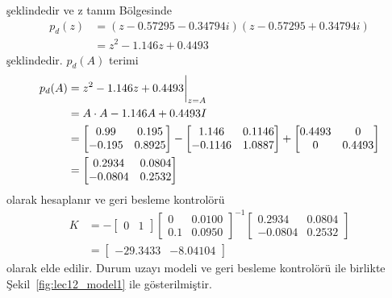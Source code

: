 şeklindedir ve z tanım Bölgesinde
\begin{equation}
    \begin{split}
        p_d(z)&=(z-0.57295-0.34794i)(z-0.57295+0.34794i)\\
        &=z^2 - 1.146z + 0.4493
    \end{split}
\end{equation}
şeklindedir. $p_d(A)$ terimi
\begin{equation}
    \begin{split}
        p_d(A)&=z^2 - 1.146z + 0.4493\bigg{|}_{z=A}\\
        &=A\cdot A - 1.146A + 0.4493I\\
        &=\begin{bmatrix} 0.99&0.195\\-0.195& 0.8925\end{bmatrix}-
        \begin{bmatrix}1.146&0.1146\\-0.1146&1.0887\end{bmatrix}+
        \begin{bmatrix}0.4493&0\\0&0.4493\end{bmatrix}\\
        &=\begin{bmatrix}0.2934&0.0804\\-0.0804&0.2532\end{bmatrix} 
    \end{split}
\end{equation}
olarak hesaplanır ve geri besleme kontrolörü
\begin{equation}
    \begin{split}
        K&=-\begin{bmatrix}0&1\end{bmatrix}\begin{bmatrix}0& 0.0100\\0.1& 0.0950\end{bmatrix}^{-1} \begin{bmatrix}0.2934&0.0804\\-0.0804&0.2532\end{bmatrix} \\
        &=\begin{bmatrix}-29.3433& -8.04104\end{bmatrix} 
    \end{split}
\end{equation}
olarak elde edilir. Durum uzayı modeli ve geri besleme kontrolörü ile birlikte Şekil~\ref{fig:lec12_model1} ile gösterilmiştir. 

